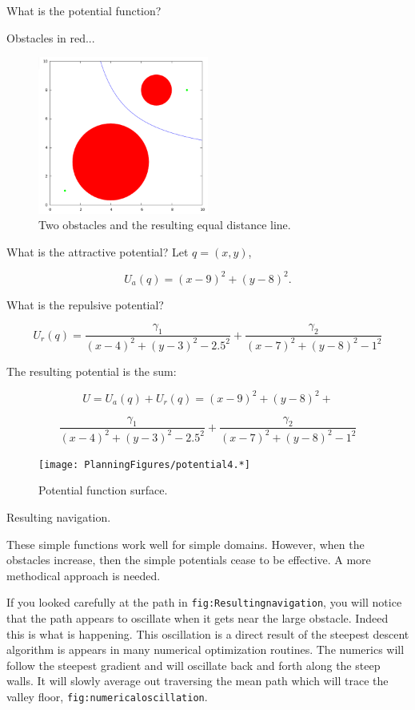 What is the potential function?

Obstacles in red...

\begin{figure}
\centering
\includegraphics[width=0.5\textwidth,height=\textheight]{PlanningFigures/circles.png}
\caption{Two obstacles and the resulting equal distance line.}
\end{figure}

What is the attractive potential? Let \(q = (x,y)\),

\[U_a(q) =(x -9)^2 + (y -8)^2.\]

What is the repulsive potential?

\[U_r (q)= \frac{\gamma_1}{(x-4)^2 + (y-3)^2 - 2.5^2} + \frac{\gamma_2}{(x-7)^2 + (y-8)^2 - 1^2}\]

The resulting potential is the sum:

\[U = U_a(q) + U_r (q)= (x -9)^2 + (y -8)^2 +\]

\[\frac{\gamma_1}{(x-4)^2 + (y-3)^2 - 2.5^2} + \frac{\gamma_2}{(x-7)^2 + (y-8)^2 - 1^2}\]

\begin{figure}
\centering
\texttt{[image: PlanningFigures/potential4.*]}
\caption{Potential function surface.}
\end{figure}

Resulting navigation.

These simple functions work well for simple domains. However, when the
obstacles increase, then the simple potentials cease to be effective. A
more methodical approach is needed.

If you looked carefully at the path in \texttt{fig:Resultingnavigation},
you will notice that the path appears to oscillate when it gets near the
large obstacle. Indeed this is what is happening. This oscillation is a
direct result of the steepest descent algorithm is appears in many
numerical optimization routines. The numerics will follow the steepest
gradient and will oscillate back and forth along the steep walls. It
will slowly average out traversing the mean path which will trace the
valley floor, \texttt{fig:numericaloscillation}.

